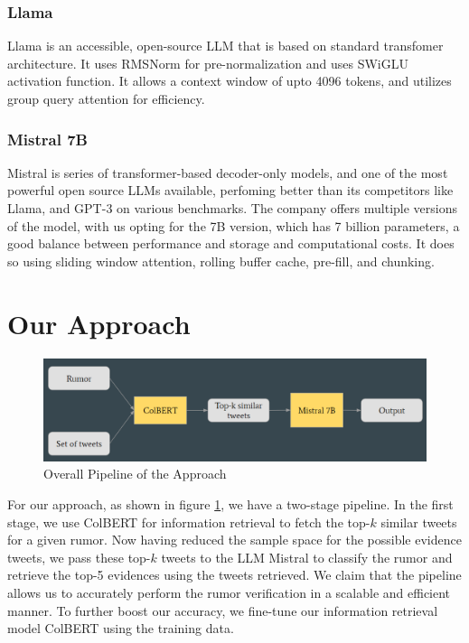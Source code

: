 \documentclass[conference]{IEEEtran}
\begin{document}
\subsubsection{Llama}
Llama is an accessible, open-source LLM that is based on standard transfomer architecture. It uses RMSNorm for pre-normalization and uses SWiGLU activation function. It allows a context window of upto 4096 tokens, and utilizes group query attention for efficiency. 

\subsubsection{Mistral 7B}
Mistral is series of transformer-based decoder-only models, and one of the most powerful open source LLMs available, perfoming better than its competitors like Llama, and GPT-3 on various benchmarks. The company offers multiple versions of the model, with us opting for the 7B version, which has 7 billion parameters, a good balance between performance and storage and computational costs. It does so using sliding window attention, rolling buffer cache, pre-fill, and chunking. 


\section{Our Approach}

\begin{figure}[htp]
    \centering
    \includegraphics[width=\columnwidth]{images/approach.png}
    \caption{Overall Pipeline of the Approach}
    \label{fig:colbert}
\end{figure}

For our approach, as shown in figure \ref{fig:colbert}, we have a two-stage pipeline. In the first stage, we use ColBERT for information retrieval to fetch the top-$k$ similar tweets for a given rumor. Now having reduced the sample space for the possible evidence tweets, we pass these top-$k$ tweets to the LLM Mistral to classify the rumor and retrieve the top-5 evidences using the tweets retrieved. We claim that the pipeline allows us to accurately perform the rumor verification in a scalable and efficient manner. To further boost our accuracy, we fine-tune our information retrieval model ColBERT using the training data.
\end{document}
